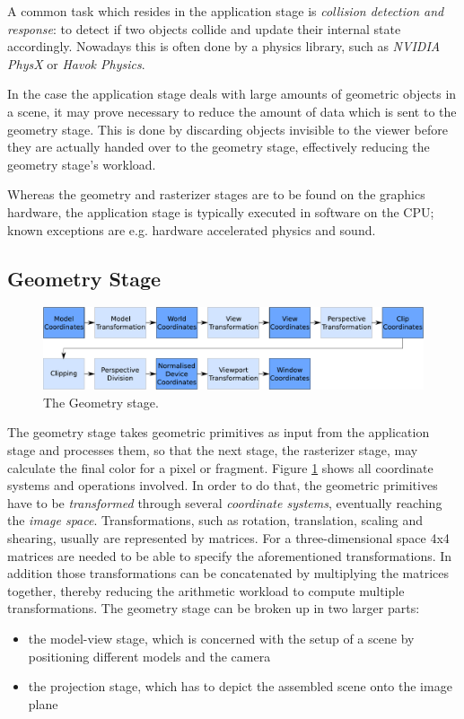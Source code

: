 A common task which resides in the application stage is \textit{collision
detection and response}: to detect if two objects collide and update their
internal state accordingly. Nowadays this is often done by a physics library,
such as \textit{NVIDIA PhysX}\cite{misc:ageia-physx} or \textit{Havok
Physics}\cite{misc:havok}.

In the case the application stage deals with large amounts of geometric
objects in a scene, it may prove necessary to reduce the amount of data which
is sent to the geometry stage. This is done by discarding objects invisible to
the viewer before they are actually handed over to the geometry stage,
effectively reducing the geometry stage's workload.

Whereas the geometry and rasterizer stages are to be found on the graphics
hardware, the application stage is typically executed in software on the CPU;
known exceptions are e.g. hardware accelerated physics and sound.

\subsection{Geometry Stage}

\begin{figure}
\begin{center}
\includegraphics[scale=0.5]{Images/Geometry-Stage.pdf}
\caption{The Geometry stage.}
\label{fig:GeometryStage}
\end{center}
\end{figure}

The geometry stage takes geometric primitives as input from the application
stage and processes them, so that the next stage, the rasterizer stage, may
calculate the final color for a pixel or fragment. Figure
\ref{fig:GeometryStage} shows all coordinate systems and operations involved. In
order to do that, the geometric primitives have to be \textit{transformed}
through several \textit{coordinate systems}, eventually reaching the
\textit{image space}. Transformations, such as rotation, translation,
scaling and shearing, usually are represented by matrices. For a
three-dimensional space 4x4 matrices are needed to be able to specify the
aforementioned transformations. In addition those transformations can be
concatenated by multiplying the matrices together, thereby reducing the
arithmetic workload to compute multiple transformations.
The geometry stage can be broken up in two larger parts:
\begin{itemize}
 \item  the model-view stage, which is concerned with the setup of a scene by
positioning different models and the camera
 \item the projection stage, which has to depict the assembled scene onto the
image plane
\end{itemize}

